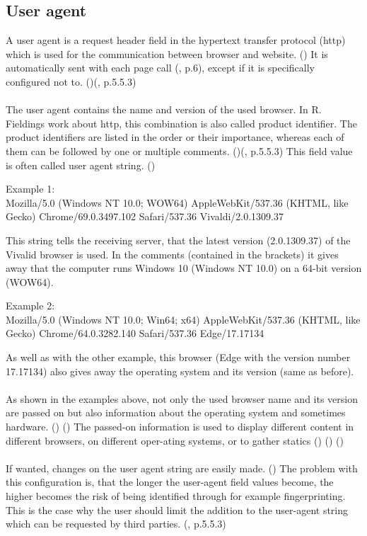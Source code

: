 \subsection{User agent}
A user agent is a request header field in the hypertext transfer protocol (http) which is used for the communication between browser and website. (\textcite{xovi18}) It is automatically sent with each page call (\textcite{doty18}, p.6), except if it is specifically configured not to. (\textcite{xovi18})(\textcite{fielding14}, p.5.5.3)\\\\
The user agent contains the name and version of the used browser. In R. Fieldings work about http, this combination is also called product identifier. The product identifiers are listed in the order or their importance, whereas each of them can be followed by one or multiple comments. (\textcite{xovi18})(\textcite{fielding14}, p.5.5.3) This field value is often called user agent string. (\textcite{hoffman16})\\
\begin{tcolorbox}
Example 1: \\
Mozilla/5.0 (Windows NT 10.0; WOW64) AppleWebKit/537.36 (KHTML, like Gecko) Chrome/69.0.3497.102 Safari/537.36 Vivaldi/2.0.1309.37
\end{tcolorbox}
This string tells the receiving server, that the latest version (2.0.1309.37) of the Vivalid browser is used. In the comments (contained in the brackets) it gives away that the computer runs Windows 10 (Windows NT 10.0) on a 64-bit version (WOW64).\\
\begin{tcolorbox}
Example 2:\\
Mozilla/5.0 (Windows NT 10.0; Win64; x64) AppleWebKit/537.36 (KHTML, like Gecko) Chrome/64.0.3282.140 Safari/537.36 Edge/17.17134\\
\end{tcolorbox}
As well as with the other example, this browser (Edge with the version number 17.17134) also gives away the operating system and its version (same as before).\\\\
As shown in the examples above, not only the used browser name and its version are passed on but also information about the operating system and sometimes hardware. (\textcite{hoffman16}) (\textcite{xovi18}) The passed-on information is used to display different content in different browsers, on different oper-ating systems, or to gather statics (\textcite{hoffman16}) (\textcite{arntz17}) (\textcite{xovi18})\\\\
If wanted, changes on the user agent string are easily made. (\textcite{arntz17})
The problem with this configuration is, that the longer the user-agent field values become, the higher becomes the risk of being identified through for example fingerprinting. This is the case why the user should limit the addition to the user-agent string which can be requested by third parties. (\textcite{fielding14}, p.5.5.3)


